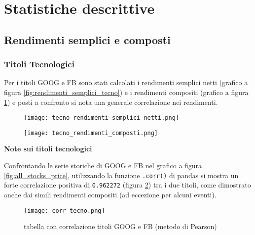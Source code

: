 
\section{Statistiche descrittive}

\subsection{Rendimenti semplici e composti}

\subsubsection{Titoli Tecnologici}

Per i titoli GOOG e FB sono stati calcolati i rendimenti semplici netti (grafico a figura \ref{fig:rendimenti_semplici_tecno}) e i rendimenti compositi (grafico a figura \ref{fig:rendimenti_compositi_tecno}) e posti a confronto
si nota una generale correlazione nei rendimenti.

\begin{figure}[h]
    \centering
    \begin{minipage}{.5\textwidth}
      \centering
      \texttt{[image: tecno\_rendimenti\_semplici\_netti.png]}
      \label{fig:rendimenti_semplici_tecno}
    \end{minipage}%
    \begin{minipage}{.5\textwidth}
      \centering
      \texttt{[image: tecno\_rendimenti\_composti.png]}
      \label{fig:rendimenti_compositi_tecno}
    \end{minipage}
\end{figure}

\textbf{Note sui titoli tecnologici}

Confrontando le serie storiche di GOOG e FB nel grafico a figura \ref{fig:all_stocks_price}, utilizzando la funzione \verb|.corr()| di pandas si mostra un forte correlazione positiva di \verb|0.962272| (figura \ref{fig:corr_tecno})
tra i due titoli, come dimostrato anche dai simili rendimenti compositi (ad eccezione per alcuni eventi).

\begin{figure}[h]
  \centering
  \texttt{[image: corr\_tecno.png]}
  \caption{tabella con correlazione titoli GOOG e FB (metodo di Pearson)}
  \label{fig:corr_tecno}
\end{figure}

